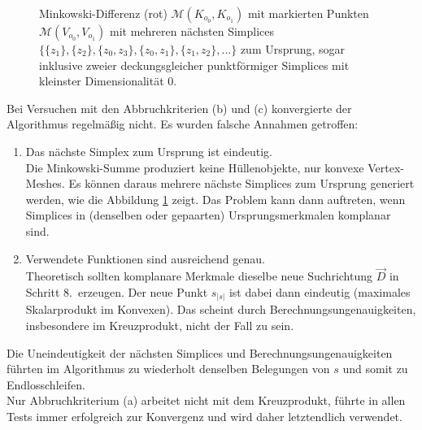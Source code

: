 \begin{enumerate}
\begin{figure}
	\caption{Minkowski-Differenz (rot) $\mathcal{M}(K_{o_0}, K_{o_1})$ mit markierten Punkten $\mathcal{M}(V_{o_0}, V_{o_1})$ mit mehreren nächsten Simplices $\{ \{z_1\},\{z_2\},\{z_0, z_3\},\{z_0,z_1\},\{z_1,z_2\}, ...\}$ zum Ursprung, sogar inklusive zweier deckungsgleicher punktförmiger Simplices mit kleinster Dimensionalität 0.}
	\label{fig:parfeat}
\end{figure}

Bei Versuchen mit den Abbruchkriterien (b) und (c) konvergierte der Algorithmus regelmäßig nicht. Es wurden falsche Annahmen getroffen:
\begin{enumerate}
\item Das nächste Simplex zum Ursprung ist eindeutig.\\
Die Minkowski-Summe produziert keine Hüllenobjekte, nur konvexe Vertex-Meshes. Es können daraus mehrere nächste Simplices zum Ursprung generiert werden, wie die Abbildung \ref{fig:parfeat} zeigt. Das Problem kann dann auftreten, wenn Simplices in (denselben oder gepaarten) Ursprungsmerkmalen komplanar sind.
\item Verwendete Funktionen sind ausreichend genau.\\
Theoretisch sollten komplanare Merkmale dieselbe neue Suchrichtung $\vec{D}$ in Schritt 8.~erzeugen. Der neue Punkt $s_{|s|}$ ist dabei dann eindeutig (maximales Skalarprodukt im Konvexen). Das scheint durch Berechnungsungenauigkeiten, insbesondere im Kreuzprodukt, nicht der Fall zu sein. 
\end{enumerate}

Die Uneindeutigkeit der nächsten Simplices und Berechnungsungenauigkeiten führten im Algorithmus zu wiederholt denselben Belegungen von $s$ und somit zu Endlosschleifen.\\
Nur Abbruchkriterium (a) arbeitet nicht mit dem Kreuzprodukt, führte in allen Tests immer erfolgreich zur Konvergenz und wird daher letztendlich verwendet.
\end{enumerate}

